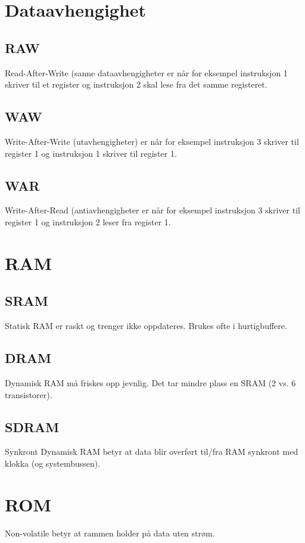 \documentclass[a4paper, 10pt]{article}
\begin{document}
\section{Dataavhengighet}
\subsection{RAW}
Read-After-Write (sanne dataavhengigheter er når for eksempel instruksjon 1 skriver til et register og instruksjon 2 skal lese fra det samme registeret.

\subsection{WAW}
Write-After-Write (utavhengigheter) er når for eksempel instruksjon 3 skriver til register 1 og instruksjon 1 skriver til register 1.

\subsection{WAR}
Write-After-Read (antiavhengigheter er når for eksempel instruksjon 3 skriver til register 1 og instruksjon 2 leser fra register 1.



\section{RAM}
\subsection{SRAM}
Statisk RAM er raskt og trenger ikke oppdateres. Brukes ofte i hurtigbuffere.

\subsection{DRAM}
Dynamisk RAM må friskes opp jevnlig. Det tar mindre plass en SRAM (2 vs. 6 transistorer).

\subsection{SDRAM} 
Synkront Dynamisk RAM betyr at data blir overført til/fra RAM synkront med klokka (og systembussen).

\section{ROM}
Non-volatile betyr at rammen holder på data uten strøm.
\end{document}
